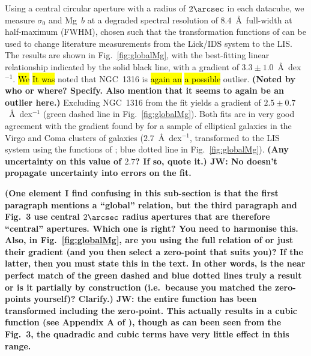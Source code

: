 \documentclass[a4paper,fleqn,usenatbib]{mnras}
\DeclareRobustCommand{\removed}[1]{{\sethlcolor{red}\hl{#1}}}
\DeclareRobustCommand{\added}[1]{{\sethlcolor{green}\hl{#1}}}
\begin{document}
Using a central circular aperture with a radius of $2\arcsec$ in each
datacube, we measure $\sigma_0$ and Mg~$b$ at a degraded spectral
resolution of $8.4$~\AA\ full-width at half-maximum (FWHM), chosen
such that the transformation functions of \citet{Vazdekis2010} can be
used to change literature measurements from the Lick/IDS system to the
LIS. The results are shown in Fig.~\ref{fig:globalMg}, with the
best-fitting linear relationship
indicated by the solid black line, with a gradient of
$3.3\pm1.0$~\AA~dex$^{-1}$. \added{We} \removed{It was} noted that NGC~1316 is \added{again an} \removed{a possible}
outlier. {\bf (Noted by who or where? Specify. Also mention that it
  seems to again be an outlier here.)} Excluding NGC~1316 from the fit
yields a gradient of $2.5\pm0.7$~\AA~dex$^{-1}$ (green dashed line in
Fig.~\ref{fig:globalMg}). Both fits are in very good agreement with
the gradient found by \citet{Ziegler1997} for a sample of elliptical
galaxies in the Virgo and Coma clusters of galaxies
($2.7$~\AA~dex$^{-1}$, transformed to the LIS system using the
functions of \citealt{Vazdekis2010}; blue dotted line in
Fig.~\ref{fig:globalMg}). {\bf (Any uncertainty on this value of
  $2.7$? If so, quote it.) JW: No \citet{Ziegler1997} doesn't propagate uncertainty into errors on the fit.}

{\bf (One element I find confusing in this sub-section is that the
  first paragraph mentions a ``global'' relation, but the third
  paragraph and Fig.~3 use central $2\arcsec$ radius apertures that
  are therefore ``central'' apertures. Which one is right? You need to
  harmonise this. Also, in Fig.~\ref{fig:globalMg}, are you using the
  full relation of \citet{Ziegler1997} or just their gradient (and you
  then select a zero-point that suits you)? If the latter, then you
  must state this in the text. In other words, is the near perfect
  match of the green dashed and blue dotted lines truly a result or is
  it partially by construction (i.e.\ because you matched the
  zero-points yourself)? Clarify.) JW: the entire function has been transformed including the zero-point. This actually results in a cubic function (see Appendix A of \citealt{Vazdekis2010}), though as can been seen from the Fig.~3, the quadradic and cubic terms have very little effect in this range.}
\end{document}
